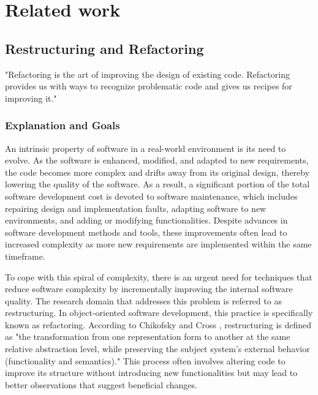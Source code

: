 
%

\chapter{Related work}
\label{cha:Related work}
    

\section{Restructuring and Refactoring}

"Refactoring is the art of improving the design of existing code. Refactoring provides us with ways to recognize problematic code and gives us recipes for improving it." \cite{wake2004refactoring} 

\cite{Refactoring2020} \cite{30yearsSoftwareRefactoring2020} \cite{smellsRefactoring2020} \cite{RefactoringFowler2002} \cite{SurveyRefactoring2004} \cite{estructuringArnold1989}

\subsection{Explanation and Goals}
An intrinsic property of software in a real-world environment is its need to evolve. As the software is enhanced, modified, and adapted to new requirements, the code becomes more complex and drifts away from its original design, thereby lowering the quality of the software. As a result, a significant portion of the total software development cost is devoted to software maintenance, which includes repairing design and implementation faults, adapting software to new environments, and adding or modifying functionalities. Despite advances in software development methods and tools, these improvements often lead to increased complexity as more new requirements are implemented within the same timeframe.

To cope with this spiral of complexity, there is an urgent need for techniques that reduce software complexity by incrementally improving the internal software quality. The research domain that addresses this problem is referred to as restructuring. In object-oriented software development, this practice is specifically known as refactoring. According to Chikofsky and Cross , restructuring is defined as "the transformation from one representation form to another at the same relative abstraction level, while preserving the subject system’s external behavior (functionality and semantics)." This process often involves altering code to improve its structure without introducing new functionalities but may lead to better observations that suggest beneficial changes.

